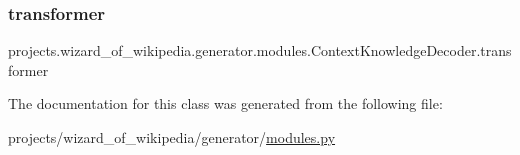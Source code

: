 \subsubsection{\texorpdfstring{transformer}{transformer}}
{\footnotesize\ttfamily projects.\+wizard\+\_\+of\+\_\+wikipedia.\+generator.\+modules.\+Context\+Knowledge\+Decoder.\+transformer}



The documentation for this class was generated from the following file\+:\begin{DoxyCompactItemize}
\item 
projects/wizard\+\_\+of\+\_\+wikipedia/generator/\hyperlink{projects_2wizard__of__wikipedia_2generator_2modules_8py}{modules.\+py}\end{DoxyCompactItemize}
